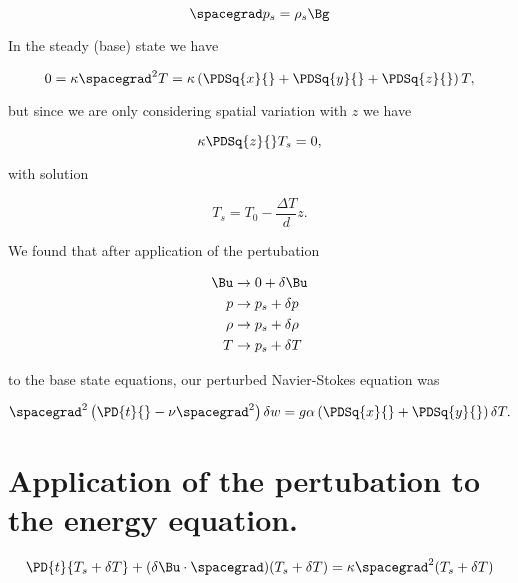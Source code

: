 \begin{equation}\label{eqn:continuumL22:70}
\spacegrad p_s = \rho_s \Bg
\end{equation}

In the steady (base) state we have

\begin{equation}\label{eqn:continuumL22:90}
0 = \kappa \spacegrad^2 T = 
\kappa \left( 
\PDSq{x}{}
+\PDSq{y}{}
+\PDSq{z}{} \right) T,
\end{equation}

but since we are only considering spatial variation with $z$ we have

\begin{equation}\label{eqn:continuumL22:110}
\kappa \PDSq{z}{} T_s = 0,
\end{equation}

with solution

\begin{equation}\label{eqn:continuumL22:130}
T_s = T_0 - \frac{\Delta T}{d} z.
\end{equation}

We found that after application of the pertubation

\begin{align}\label{eqn:continuumL22:150}
\Bu &\rightarrow 0 + \delta \Bu \\
p &\rightarrow p_s + \delta p \\
\rho &\rightarrow p_s + \delta \rho \\
T &\rightarrow p_s + \delta T
\end{align}

to the base state equations, our perturbed Navier-Stokes equation was

\begin{equation}\label{eqn:continuumL22:170}
\spacegrad^2 \left( \PD{t}{} - \nu \spacegrad^2 \right) \delta w = g \alpha 
\left(
\PDSq{x}{}
+\PDSq{y}{}
\right)
\delta T.
\end{equation}

\section{Application of the pertubation to the energy equation.}

\begin{equation}\label{eqn:continuumL22:190}
\PD{t}{T_s + \delta T} + (\delta \Bu \cdot \spacegrad) (T_s + \delta T) = \kappa \spacegrad^2 (T_s + \delta T)
\end{equation}

